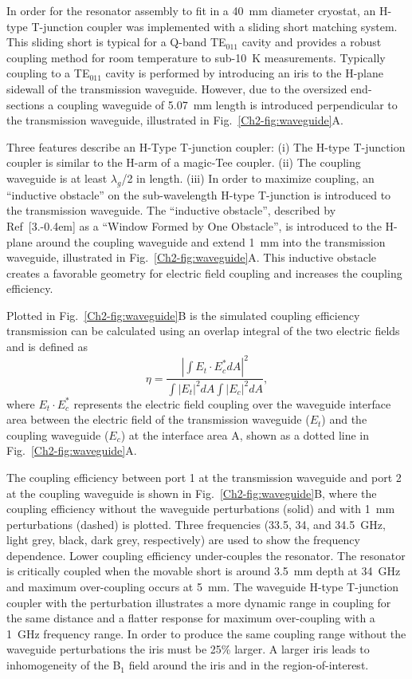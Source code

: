 In order for the resonator assembly to fit in a 40~mm diameter cryostat, an H-type T-junction coupler was implemented with a sliding short matching system. This sliding short is typical for a Q-band TE$_{011}$ cavity and provides a robust coupling method for room temperature to sub-10~K measurements. \cite{generalte011} Typically coupling to a TE$_{011}$ cavity is performed by introducing an iris to the H-plane sidewall of the transmission waveguide. However, due to the oversized end-sections a coupling waveguide of 5.07~mm length is introduced perpendicular to the transmission waveguide, illustrated in Fig.~\ref{Ch2-fig:waveguide}A. 

Three features describe an H-Type T-junction coupler: (i) The H-type T-junction coupler is similar to the H-arm of a magic-Tee coupler. \cite{ramo1984fields, MITRadWaveguide} (ii) The coupling waveguide is at least $\lambda_g$/2 in length. (iii) In order to maximize coupling, an ``inductive obstacle'' on the sub-wavelength H-type T-junction is introduced to the transmission waveguide. The ``inductive obstacle'', described by Ref~[3.\kern-0.4em] as a ``Window Formed by One Obstacle'', is introduced to the H-plane around the coupling waveguide and extend 1~mm into the transmission waveguide, illustrated in Fig.~\ref{Ch2-fig:waveguide}A. This inductive obstacle creates a favorable geometry for electric field coupling and increases the coupling efficiency. 

Plotted in Fig.~\ref{Ch2-fig:waveguide}B is the simulated coupling efficiency transmission can be calculated using an overlap integral \cite{born} of the two electric fields and is defined as
\begin{equation}
    \eta = \frac{\left| \int E_{t} \cdot E^*_{c} dA\right|^2}{\int \left|E_t\right|^2 dA \int \left|E_c\right|^2 dA},
\end{equation}
where $E_{t} \cdot E^*_{c}$ represents the electric field coupling over the waveguide interface area between the electric field of the transmission waveguide ($E_{t}$) and the coupling waveguide ($E_{c}$) at the interface area A, shown as a dotted line in Fig.~\ref{Ch2-fig:waveguide}A. 

The coupling efficiency between port 1 at the transmission waveguide and port 2 at the coupling waveguide is shown in Fig.~\ref{Ch2-fig:waveguide}B, where the coupling efficiency without the waveguide perturbations (solid) and with 1~mm perturbations (dashed) is plotted. Three frequencies (33.5, 34, and 34.5~GHz, light grey, black, dark grey, respectively) are used to show the frequency dependence. Lower coupling efficiency under-couples the resonator. The resonator is critically coupled when the movable short is around 3.5~mm depth at 34~GHz and maximum over-coupling occurs at 5~mm. The waveguide H-type T-junction coupler with the perturbation illustrates a more dynamic range in coupling for the same distance and a flatter response for maximum over-coupling with a 1~GHz frequency range. In order to produce the same coupling range without the waveguide perturbations the iris must be 25\% larger. A larger iris leads to inhomogeneity of the B$_1$ field around the iris and in the region-of-interest. 

